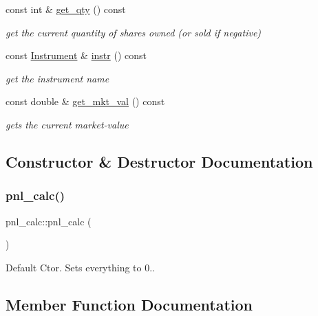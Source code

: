 \begin{DoxyCompactItemize}
const int \& \hyperlink{classpnl__calc_ae85f96910ab2ca12da816e3d20f69134}{get\+\_\+qty} () const
\begin{DoxyCompactList}\small\item\em get the current quantity of shares owned (or sold if negative) \end{DoxyCompactList}\item 
const \hyperlink{classInstrument}{Instrument} \& \hyperlink{classpnl__calc_a8fae6426142e1318162be3b8177b8e55}{instr} () const
\begin{DoxyCompactList}\small\item\em get the instrument name \end{DoxyCompactList}\item 
const double \& \hyperlink{classpnl__calc_a02d80e8a30ca4d9423961a3600ced266}{get\+\_\+mkt\+\_\+val} () const
\begin{DoxyCompactList}\small\item\em gets the current market-\/value \end{DoxyCompactList}\end{DoxyCompactItemize}


\subsection{Constructor \& Destructor Documentation}
\mbox{\label{classpnl__calc_a0b2bc0285a608ec5025b4918f386d18f}} 
\subsubsection{\texorpdfstring{pnl\+\_\+calc()}{pnl\_calc()}}
{\footnotesize\ttfamily pnl\+\_\+calc\+::pnl\+\_\+calc (\begin{DoxyParamCaption}{ }\end{DoxyParamCaption})}



Default Ctor. Sets everything to 0.. 



\subsection{Member Function Documentation}
\mbox{\label{classpnl__calc_ab97da4de5a2d1b1c98b055b1256e0109}} 
